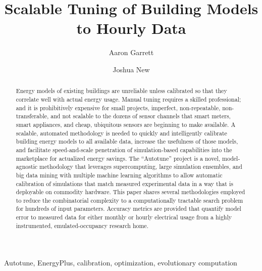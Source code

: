 \documentclass[preprint, review, 12pt]{elsarticle}
\begin{document}
\begin{frontmatter}

\title{Scalable Tuning of Building Models to Hourly Data}

\author[atr:garrett]{Aaron Garrett} %
\author[atr:new]{Joshua New}

\address[atr:garrett]{Mathematical, Computing, and Information Sciences, Jacksonville State University, Jacksonville, AL, USA}
\address[atr:new]{Oak Ridge National Laboratory, Oak Ridge, TN, USA}


\begin{abstract}
Energy models of existing buildings are unreliable unless calibrated so that they correlate well with actual energy usage. Manual tuning requires a skilled professional; and it is prohibitively expensive for small projects, imperfect, non-repeatable, non-transferable, and not scalable to the dozens of sensor channels that smart meters, smart appliances, and cheap, ubiquitous sensors are beginning to make available. A scalable, automated methodology is needed to quickly and intelligently calibrate building energy models to all available data, increase the usefulness of those models, and facilitate speed-and-scale penetration of simulation-based capabilities into the marketplace for actualized energy savings. The ``Autotune'' project is a novel, model-agnostic methodology that leverages supercomputing, large simulation ensembles, and big data mining with multiple machine learning algorithms to allow automatic calibration of simulations that match measured experimental data in a way that is deployable on commodity hardware. This paper shares several methodologies employed to reduce the combinatorial complexity to a computationally tractable search problem for hundreds of input parameters. Accuracy metrics are provided that quantify model error to measured data for either monthly or hourly electrical usage from a highly instrumented, emulated-occupancy research home.
\end{abstract}

\begin{keyword}
Autotune, EnergyPlus, calibration, optimization, evolutionary computation
\end{keyword}

\end{frontmatter}

\end{document}
